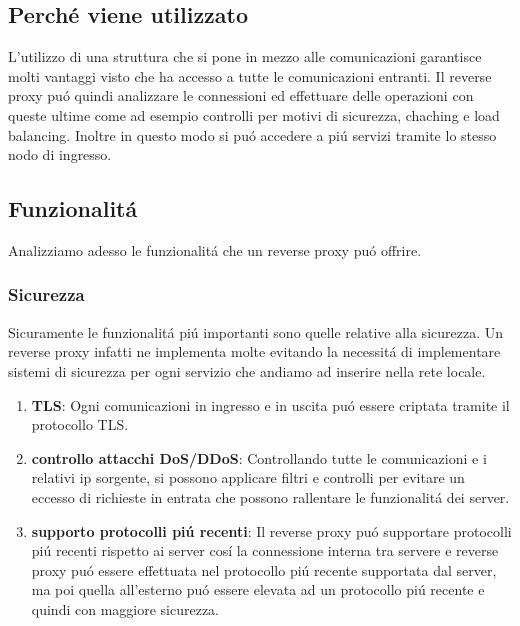 \subsection{Perché viene utilizzato}
L'utilizzo di una struttura che si pone in mezzo alle comunicazioni garantisce molti vantaggi visto che ha accesso a tutte le comunicazioni entranti. Il reverse proxy puó quindi analizzare le connessioni ed effettuare delle operazioni con queste ultime come ad esempio controlli per motivi di sicurezza, chaching e load balancing. Inoltre in questo modo si puó accedere a piú servizi tramite lo stesso nodo di ingresso.

\subsection{Funzionalitá}
Analizziamo adesso le funzionalitá che un reverse proxy puó offrire.

\subsubsection{Sicurezza}
Sicuramente le funzionalitá piú importanti sono quelle relative alla sicurezza. Un reverse proxy infatti ne implementa molte evitando la necessitá di implementare sistemi di sicurezza per ogni servizio che andiamo ad inserire nella rete locale.
\begin{enumerate}
  \item \textbf{TLS}: Ogni comunicazioni in ingresso e in uscita puó essere criptata tramite il protocollo TLS.
  \item \textbf{controllo attacchi DoS/DDoS}: Controllando tutte le comunicazioni e i relativi ip sorgente, si possono applicare filtri e controlli per evitare un eccesso di richieste in entrata che possono rallentare le funzionalitá dei server.
  \item \textbf{supporto protocolli piú recenti}: Il reverse proxy puó supportare protocolli piú recenti rispetto ai server cosí la connessione interna tra servere e reverse proxy puó essere effettuata nel protocollo piú recente supportata dal server, ma poi quella all'esterno puó essere elevata ad un protocollo piú recente e quindi con maggiore sicurezza.

\end{enumerate}


